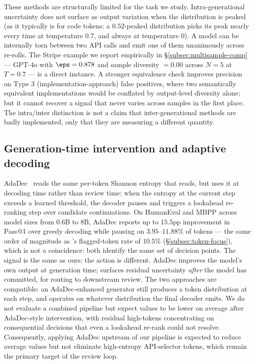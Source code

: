 These methods are structurally limited for the task we study.
Intra-generational uncertainty does not surface as output variation
when the distribution is peaked (as it typically is for code tokens:
a $0.52$-peaked distribution picks its peak nearly every time at
temperature $0.7$, and always at temperature $0$). A model can be
internally torn between two API calls and emit one of them unanimously
across re-rolls. The Stripe example we report empirically in
\S\ref{subsec:multisample-comp} --- GPT-4o with $\eps=0.878$ and
sample diversity $=0.00$ across $N=5$ at $T=0.7$ --- is a direct
instance. A stronger equivalence check improves precision on Type 3
(implementation-approach) false positives, where two semantically
equivalent implementations would be conflated by output-level
diversity alone; but it cannot recover a signal that never varies
across samples in the first place. The intra/inter distinction is
not a claim that inter-generational methods are badly implemented,
only that they are measuring a different quantity.

\subsection{Generation-time intervention and adaptive decoding}
\label{subsec:related-adadec}

AdaDec~\cite{adadec2025} reads the same per-token Shannon entropy
that \eps reads, but uses it at decoding time rather than review
time: when the entropy at the current step exceeds a learned
threshold, the decoder pauses and triggers a lookahead re-ranking
step over candidate continuations. On HumanEval and MBPP across
model sizes from $0.6$B to $8$B, AdaDec reports up to $15.5$pp
improvement in Pass@1 over greedy decoding while pausing on
$3.95$--$11.88\%$ of tokens --- the same order of magnitude as
\eps's flagged-token rate of $10.5\%$ (\S\ref{subsec:token-focus}),
which is not a coincidence: both identify the same set of decision
points. The signal is the same as ours; the action is different.
AdaDec improves the model's own output at generation time; \eps
surfaces residual uncertainty \emph{after} the model has committed,
for routing to downstream review. The two approaches are compatible:
an AdaDec-enhanced generator still produces a token distribution at
each step, and \eps operates on whatever distribution the final
decoder emits. We do not evaluate a combined pipeline but expect
\eps values to be lower on average after AdaDec-style intervention,
with residual high-\eps tokens concentrating on consequential
decisions that even a lookahead re-rank could not resolve.
Consequently, applying AdaDec upstream of our pipeline is expected to
reduce average \eps values but not eliminate high-entropy API-selector
tokens, which remain the primary target of the review loop.

